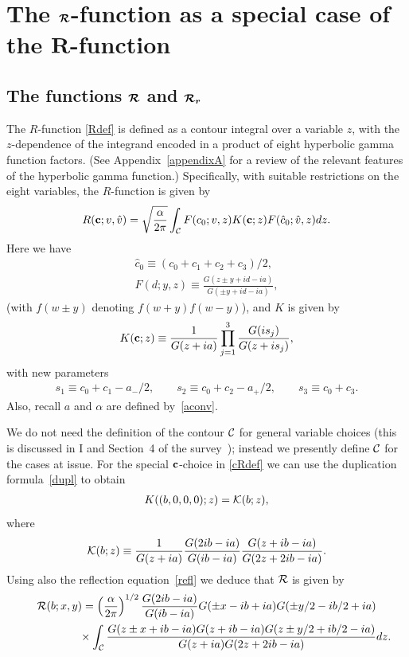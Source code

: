 \documentclass[11pt]{article}
\numberwithin{equation}{section}
\newcommand{\cR}{{\cal R}}
\newcommand{\cC}{{\cal C}}
\newcommand{\cK}{{\cal K}}
\begin{document}
\section[The $\cR$-function as a special case of the $R$-function]{The $\boldsymbol{\cR}$-function as a special case of the $\boldsymbol{R}$-function}\label{section2}

\subsection[The functions $\cR$ and $\cR_r$]{The functions $\boldsymbol{\cR}$ and $\boldsymbol{\cR_r}$}\label{section2.1}

The $R$-function \eqref{Rdef} is def\/ined as a contour integral over a variable $z$, with the $z$-dependence of the integrand encoded in a product of eight hyperbolic gamma function factors.
(See Appendix~\ref{appendixA} for a review of the relevant features of the hyperbolic gamma function.)
Specif\/ically,
with suitable restrictions on the eight variables, the $R$-function is given by
\begin{gather}\label{R}
R({\bf c};v,\hat{v})=\sqrt{\frac{\alpha}{2\pi}}\int_{\cal
C}F(c_0;v,z)K({\bf c};z)F(\hat{c}_0;\hat{v},z)dz.
\end{gather}
Here we have
\begin{gather}
\hat{c}_0\equiv (c_0+c_1+c_2+c_3)/2,
\\
\label{F}
F(d;y,z)\equiv
\frac{G(z\pm y+id-ia)}{G(\pm y+id-ia)},
\end{gather}
(with $f(w\pm y)$ denoting $f(w+y)f(w-y)$), and $K$ is given by
\begin{gather}\label{K}
K({\bf c};z)\equiv
\frac{1}{G(z+ia)}\prod_{j=1}^3\frac{G(is_j)}{G(z+is_j)},
\end{gather}
with new parameters
\begin{gather}\label{defsj}
s_1\equiv c_0+c_1-a_{-}/2,\qquad s_2\equiv c_0+c_2-a_{+}/2,\qquad s_3\equiv
c_0+c_3.
\end{gather}
Also, recall $a$ and $\alpha$ are def\/ined by~\eqref{aconv}.

We do not need the def\/inition of the contour $\cC$ for general variable choices (this is discussed in I and Section~4 of the survey~\cite{Rsurv}); instead we presently def\/ine $\cC$ for the cases at issue. For the special ${\bf c}$-choice in \eqref{cRdef} we can use the duplication formula~\eqref{dupl} to obtain
\begin{gather}
K((b,0,0,0);z)=\cK(b;z),
\end{gather}
where
\begin{gather}
\cK(b;z)\equiv \frac{1}{G(z+ia)}\frac{G(2ib-ia)}{G(ib-ia)}\frac{G(z+ib-ia)}{G(2z+2ib-ia)}.
\end{gather}
Using also the ref\/lection equation~\eqref{refl}
we deduce that $\cR$ is given by
\begin{gather}
\cR(b;x,y)     =     \left(\frac{\alpha}{2\pi}\right)^{1/2}\frac{G(2ib-ia)}{G(ib-ia)}G(\pm x-ib+ia)G(\pm y/2-ib/2+ia)
\nonumber \\
\phantom{\cR(b;x,y)     =}{}\times \int_{\cal
C}\frac{G(z\pm x+ib-ia)G(z+ib-ia)G(z\pm y/2+ib/2-ia)}{G(z+ia)G(2z+2ib-ia)}dz.\label{cRcont}
\end{gather}
\end{document}
